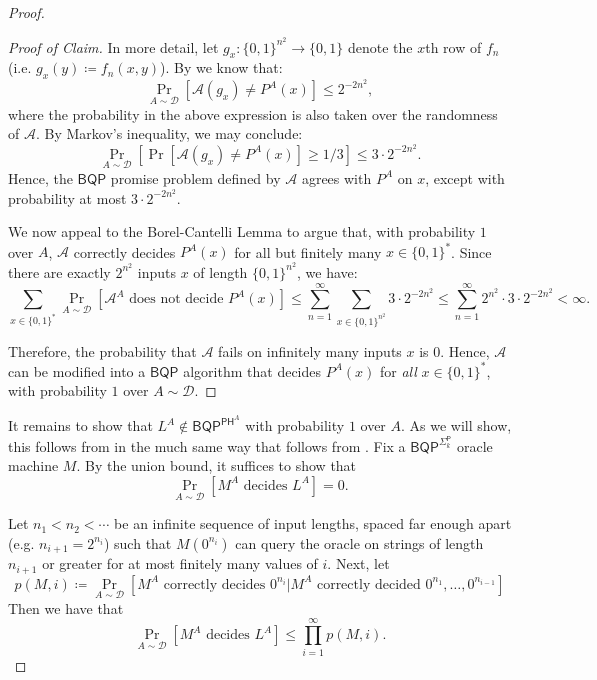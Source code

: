 \documentclass[10pt,a4paper]{article}
\begin{document}
\begin{proof}
\begin{proof}[Proof of Claim]
In more detail, let $g_x: \{0,1\}^{n^2} \to \{0,1\}$ denote the $x$th row of $f_n$ (i.e. $g_x(y) \coloneqq f_n(x, y)$). By  we know that:
\[
\Pr_{A \sim \mathcal{D}} \left[\mathcal{A}(g_x) \neq P^A(x)\right] \le 2^{-2n^2},
\]
where the probability in the above expression is also taken over the randomness of $\mathcal{A}$. By Markov's inequality, we may conclude:
\[
\Pr_{A \sim \mathcal{D}} \left[\Pr\left[\mathcal{A}(g_x) \neq P^A(x)\right] \ge 1/3\right] \le 3 \cdot 2^{-2n^2}.
\]
Hence, the $\mathsf{BQP}$ promise problem defined by $\mathcal{A}$ agrees with $P^A$ on $x$, except with probability at most $3 \cdot 2^{-2n^2}$.

We now appeal to the Borel-Cantelli Lemma to argue that, with probability $1$ over $A$, $\mathcal{A}$ correctly decides $P^A(x)$ for all but finitely many $x \in \{0,1\}^*$. Since there are exactly $2^{n^2}$ inputs $x$ of length $\{0,1\}^{n^2}$, we have:
\[
\sum_{x \in \{0,1\}^*} \Pr_{A\sim \mathcal{D}}\left[\mathcal{A}^A \text{ does not decide } P^A(x)\right] \le \sum_{n=1}^{\infty} \sum_{x \in \{0,1\}^{n^2}} 3 \cdot 2^{-2n^2} \le \sum_{n=1}^{\infty} 2^{n^2} \cdot 3 \cdot 2^{-2n^2} < \infty.
\]

Therefore, the probability that $\mathcal{A}$ fails on infinitely many inputs $x$ is $0$. Hence, $\mathcal{A}$ can be modified into a $\mathsf{BQP}$ algorithm that decides $P^A(x)$ for \textit{all} $x \in \{0,1\}^*$, with probability $1$ over $A \sim \mathcal{D}$.
\end{proof}

It remains to show that $L^A \not\in \mathsf{BQP}^{\mathsf{PH}^A}$ with probability $1$ over $A$. As we will show, this follows from  in the much same way that  follows from . Fix a $\mathsf{BQP}^{\mathsf{\Sigma}_k^{\mathsf{P}}}$ oracle machine $M$. By the union bound, it suffices to show that
\[
\Pr_{A \sim \mathcal{D}}\left[M^A \text{ decides } L^A\right]=0.
\]

Let $n_1<n_2<\cdots$ be an infinite sequence of input lengths, spaced far enough apart (e.g. $n_{i+1}=2^{n_i}$) such that $M\left(0^{n_i}\right)$ can query the oracle on strings of length $n_{i+1}$ or greater for at most finitely many values of $i$. Next, let
\[
p(M,i)\coloneqq\Pr_{A \sim \mathcal{D}}\left[M^A \text{ correctly decides } 0^{n_i}|M^A \text{ correctly decided }0^{n_1},\dots,0^{n_{i-1}}\right]
\]
Then we have that
\[
\Pr_{A \sim \mathcal{D}}\left[M^A\text{ decides }L^A\right]\leq\prod_{i=1}^\infty p(M,i).
\]


\end{proof}
\end{document}
